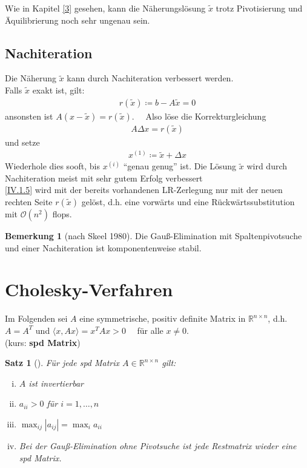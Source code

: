 \documentclass[ngerman,fontsize=11pt, paper=a4, parskip=half, titlepage=true, toc=bib]{scrbook}
\theoremstyle{definition}
\newtheorem{Bem}[Def]{Bemerkung}	%
\theoremstyle{plain}
\newtheorem{Satz}[Def]{Satz}		%
\newcommand{\Renn}{\mathds{R}^{n\times n}}
\newcommand{\sectione}[1]{ \setcounter{equation}{0}\section{#1}}
\newcommand{\subsectione}[1]{\addtocounter{Def}{1}\subsection{#1}}
\newenvironment{Satze}[1][]{ %
	\begin{Satz}[#1]
}
{
	\end{Satz}
	\addtocounter{subsection}{1}
}
\newenvironment{Beme}[1][]{ %
	\begin{Bem}[#1]
	}
	{
	\end{Bem}
	\addtocounter{subsection}{1}
}
\begin{document}
  Wie in Kapitel \ref{3} gesehen, kann die Näherungslösung $\widetilde{x}$ 
  trotz Pivotisierung und Äquilibrierung noch sehr ungenau sein.


  \subsectione{Nachiteration} 
  Die Näherung $\widetilde{x}$ kann durch Nachiteration verbessert werden. \\
  Falls $\widetilde{x}$ exakt ist, gilt:
  \begin{gather}
    r(\widetilde{x}) \coloneqq b-A\widetilde{x} =0 \label{IV.1.4}
  \end{gather}
  ansonsten ist $A(x-\widetilde{x})=r(\widetilde{x}).$ \ \
  Also löse die Korrekturgleichung
  \begin{gather}
    A\Delta x = r(\widetilde{x}) 	\label{IV.1.5}
  \end{gather}
  und setze
  \begin{gather*}
    x^{(1)} \coloneqq \widetilde{x} +\Delta x
  \end{gather*}
  Wiederhole dies sooft, bis $x^{(i)}$ \enquote{genau genug} ist.
  Die Lösung $\widetilde{x}$ wird durch Nachiteration meist mit sehr gutem Erfolg verbessert
  \cite[genaueres in ][]{dahmenreusken}\\
  \eqref{IV.1.5} wird mit der bereits vorhandenen LR-Zerlegung
  nur mit der neuen rechten Seite $r(\widetilde{x})$ gelöst, 
  d.h. eine vorwärts und eine Rückwärtssubstitution
  mit $\mathcal{O}(n^2)$ flops.

\begin{Beme}[nach Skeel 1980]
	Die Gauß-Elimination mit Spaltenpivotsuche und einer Nachiteration
	ist komponentenweise stabil.
\end{Beme}
  

  \sectione{Cholesky-Verfahren}
  Im Folgenden sei $A$ eine symmetrische, positiv definite Matrix in $\Renn $, d.h.
  $A=A^T$ und $\langle x, Ax \rangle = x^TAx > 0 \quad $ für alle $ x\neq 0$. \\
  (kurs: \textbf{spd Matrix}) \index{spd Matrix}

  \begin{Satze}
  	\label{4.2.1}
  	Für jede spd Matrix $A\in \Renn $ gilt:
  	\begin{enumerate}[i)]	
  		\item $A$ ist invertierbar
  		\item $a_{ii}>0$ für $i=1, \dots , n$
  		\item $\max_{ij}|a_{ij}| = \max_{i}a_{ii}$
  		\item Bei der Gauß-Elimination ohne Pivotsuche ist jede Restmatrix wieder eine spd Matrix.
  	\end{enumerate}
  \end{Satze}
    	
\end{document}
